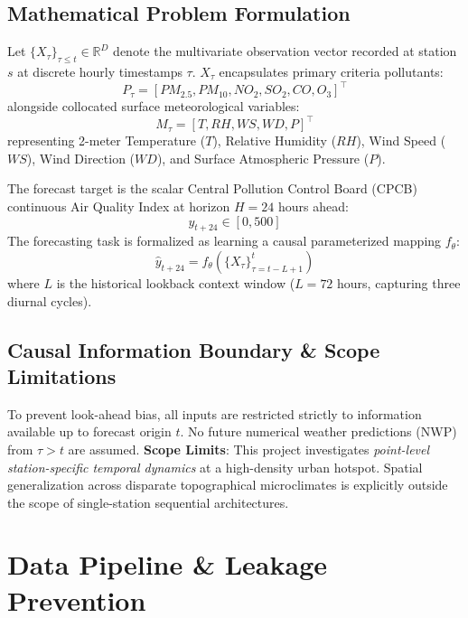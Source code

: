 \documentclass[10pt,journal,compsoc,twocolumn]{article}
\begin{document}
\subsection{Mathematical Problem Formulation}
Let $\{X_{\tau}\}_{\tau \le t} \in \mathbb{R}^{D}$ denote the multivariate observation vector recorded at station $s$ at discrete hourly timestamps $\tau$. $X_\tau$ encapsulates primary criteria pollutants:
\begin{equation}
    P_\tau = [PM_{2.5}, PM_{10}, NO_2, SO_2, CO, O_3]^\top
\end{equation}
alongside collocated surface meteorological variables:
\begin{equation}
    M_\tau = [T, RH, WS, WD, P]^\top
\end{equation}
representing 2-meter Temperature ($T$), Relative Humidity ($RH$), Wind Speed ($WS$), Wind Direction ($WD$), and Surface Atmospheric Pressure ($P$).

The forecast target is the scalar Central Pollution Control Board (CPCB) continuous Air Quality Index at horizon $H = 24$ hours ahead:
\begin{equation}
    y_{t+24} \in [0, 500]
\end{equation}
The forecasting task is formalized as learning a causal parameterized mapping $f_\theta$:
\begin{equation}
    \hat{y}_{t+24} = f_\theta \left( \{X_\tau\}_{\tau = t - L + 1}^{t} \right)
\end{equation}
where $L$ is the historical lookback context window ($L = 72$ hours, capturing three diurnal cycles). 

\subsection{Causal Information Boundary \& Scope Limitations}
To prevent look-ahead bias, all inputs are restricted strictly to information available up to forecast origin $t$. No future numerical weather predictions (NWP) from $\tau > t$ are assumed.
\textbf{Scope Limits}: This project investigates \textit{point-level station-specific temporal dynamics} at a high-density urban hotspot. Spatial generalization across disparate topographical microclimates is explicitly outside the scope of single-station sequential architectures.

\section{Data Pipeline \& Leakage Prevention}
\end{document}
